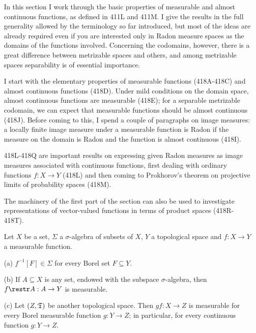 
\def\undphi{\underline{\phi}}

\def\chaptername{Topologies and measures I}
\def\sectionname{Measurable functions and almost continuous functions}


In this section I work through the basic properties of measurable and
almost continuous functions, as defined in 411L and 411M.   I give the
results in
the full generality allowed by the terminology so far introduced, but
most of the ideas are already required even if you are interested only
in Radon measure spaces as the domains of the functions involved.
Concerning the
codomains, however, there is a great difference between metrizable
spaces and others, and among metrizable spaces separability is of
essential importance.

I start with the elementary properties of measurable functions
(418A-418C) and almost continuous functions (418D).
Under mild conditions on
the domain space, almost continuous functions are measurable (418E);
for a separable metrizable codomain, we can expect that measurable
functions should be almost continuous (418J).   Before coming to this, I
spend a couple of paragraphs on image
measures:  a locally finite image
measure under a measurable function is Radon if the measure
on the domain is Radon and the function is almost continuous (418I).

418L-418Q are important results on expressing given Radon measures as
image measures associated with continuous functions, first dealing with
ordinary functions $f:X\to Y$ (418L) and then coming to Prokhorov's
theorem on projective limits of probability spaces (418M).

The machinery of the first part of the section can also be used to
investigate representations of vector-valued functions in terms of
product spaces (418R-418T).

 Let $X$ be a set, $\Sigma$ a $\sigma$-algebra
of subsets of $X$, $Y$ a
topological space and $f:X\to Y$ a measurable function.

(a) $f^{-1}[F]\in\Sigma$ for every Borel set $F\subseteq Y$.

(b) If $A\subseteq X$ is any set, endowed with the subspace
$\sigma$-algebra, then $f\restr A:A\to Y$ is measurable.

(c) Let $(Z,\frak T)$ be another topological space.   Then $gf:X\to Z$
is measurable for every Borel measurable function $g:Y\to Z$;  in
particular, for every continuous function $g:Y\to Z$.

